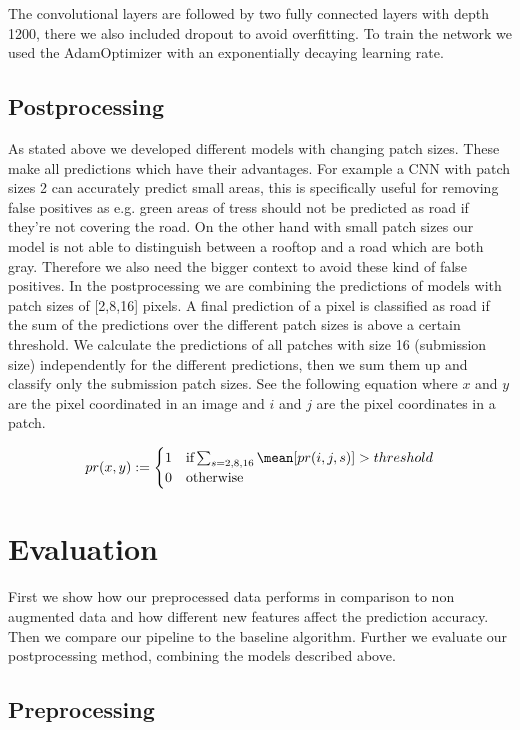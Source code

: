 \documentclass[10pt,conference,compsocconf]{IEEEtran}
\begin{document}
The convolutional layers are followed by two fully connected layers with depth 1200, there we also included dropout to avoid overfitting. To train the network we used the AdamOptimizer \cite{adam} with an exponentially decaying learning rate.

    
\subsection{Postprocessing}
As stated above we developed different models with changing patch sizes. These make all predictions which have their advantages. For example a CNN with patch sizes 2 can accurately predict small areas, this is specifically useful for removing false positives as e.g. green areas of tress should not be predicted as road if they're not covering the road. On the other hand with small patch sizes our model is not able to distinguish between a rooftop and a road which are both gray. Therefore we also need the bigger context to avoid these kind of false positives. In the postprocessing we are combining the predictions of models with patch sizes of [2,8,16] pixels. A final prediction of a pixel is classified as road if the sum of the predictions over the different patch sizes is above a certain threshold. We calculate the predictions of all patches with size 16 (submission size) independently for the different predictions, then we sum them up and classify only the submission patch sizes. See the following equation where $x$ and $y$ are the pixel coordinated in an image and $i$ and $j$ are the pixel coordinates in a patch.

\[
pr(x,y) :=
\begin{cases}
	1 & \text{if} \sum_{s={2,8,16}} \mean[pr(i,j,s)] > threshold\\
	0 & \text{otherwise}
\end{cases}
\]


\section{Evaluation}
First we show how our preprocessed data performs in comparison to non augmented data and how different new features affect the prediction accuracy. Then we compare our pipeline to the baseline algorithm. Further we evaluate our postprocessing method, combining the models described above. 

\subsection{Preprocessing}
\end{document}
